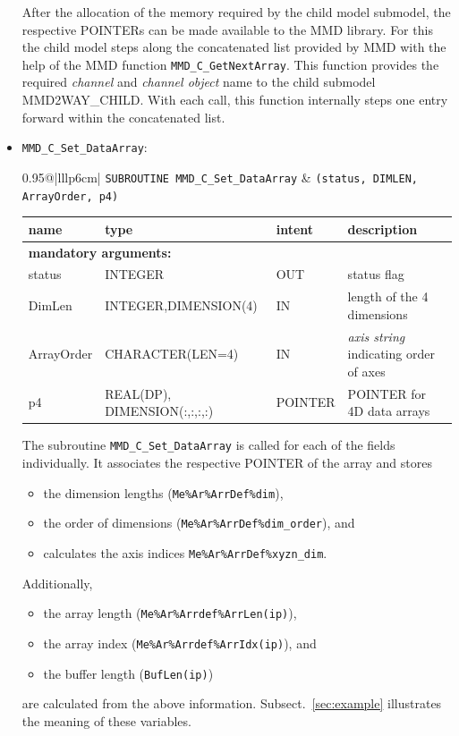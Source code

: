 \documentclass[twoside]{article}
\begin{document}
\begin{itemize}
After the allocation of the memory required by the child model submodel, the 
respective {\footnotesize POINTER}s can be made available to the MMD library.
For this the child model steps along the concatenated list provided by
MMD with the 
help of the MMD function \verb|MMD_C_GetNextArray|. This function provides
the required {\it channel} and {\it channel object} name to the child submodel 
MMD2WAY\_CHILD. With each call, this function internally steps one entry 
forward within the concatenated list.
\clearpage
\item  \verb|MMD_C_Set_DataArray|:\\
\vspace*{-0.3cm}

\begin{tabular*}{0.95\textwidth}{@{\extracolsep\fill}|lllp{6cm}|}
\hline
{}
{\tt SUBROUTINE MMD\_C\_Set\_DataArray} &
{\tt (status, DIMLEN, ArrayOrder, p4)}\\
\hline
\end{tabular*}
\begin{tabular*}{0.95\textwidth}{@{\extracolsep\fill}|lllp{6cm}|}
name & type & intent & description\\
\hline
\multicolumn{4}{|l|}{\bf mandatory arguments:}\\
status & {\footnotesize INTEGER} & OUT & status flag \\
DimLen & {\footnotesize INTEGER,DIMENSION(4)} & IN & length of the 4 dimensions \\
ArrayOrder & {\footnotesize CHARACTER(LEN=4)} & IN & {\it axis string} indicating order of axes \\
p4 & {\footnotesize REAL(DP), DIMENSION(:,:,:,:)}& {\footnotesize POINTER} & {\footnotesize POINTER} for 4D data arrays \\
\hline
\end{tabular*}
\smallskip
\vspace*{-0.3cm}

 The subroutine \verb|MMD_C_Set_DataArray| is called for each of the
 fields individually. It associates the respective {\footnotesize POINTER} of the array and stores
\begin{itemize}
\item  the dimension lengths (\verb|Me%Ar%ArrDef%dim|),
\item  the order of dimensions (\verb|Me%Ar%ArrDef%dim_order|), and
\item  calculates the axis indices \verb|Me%Ar%ArrDef%xyzn_dim|.
\end{itemize}
 Additionally,
\begin{itemize} 
\item the array length (\verb|Me%Ar%Arrdef%ArrLen(ip)|),
\item  the array index (\verb|Me%Ar%Arrdef%ArrIdx(ip)|), and 
\item the buffer length (\verb|BufLen(ip)|)
\end{itemize}
are calculated from the above information.
Subsect.\ \ref{sec:example} illustrates the meaning of these variables.


\end{itemize}
\end{document}
